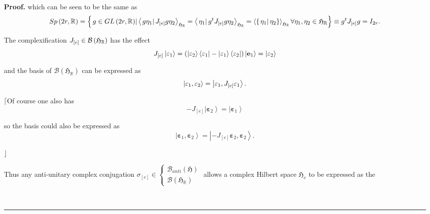 \documentclass[aps,preprint]{revtex4}
\newenvironment{proof}[1][Proof]{\noindent\textbf{#1.} }{\ \rule{0.5em}{0.5em}}
\begin{document}
\begin{proof}
which can be seen to be the same as%
\begin{equation}
Sp\left( 2r,\mathbb{R}\right) =\left\{ \left. g\in GL\left( 2r,\mathbb{R}%
\right) \right\vert \left\langle \left. g\eta_{1}\right\vert J_{\left[ e%
\right] }g\eta_{2}\right\rangle _{\mathfrak{H}_{\mathbb{R}}}=\left\langle
\left. \eta_{1}\right\vert g^{t}J_{\left[ e\right] }g\eta_{2}\right\rangle _{%
\mathfrak{H}_{\mathbb{R}}}=\left\langle \left\{ \left. \eta_{1}\right\vert
\eta_{2}\right\} \right\rangle _{\mathfrak{H}_{\mathbb{R}}}\forall\eta_{1},%
\eta_{2}\in\mathfrak{H}_{\mathbb{R}}\right\} \equiv g^{t}J_{\left[ e\right]
}g=I_{2r}.
\end{equation}

The complexification $J_{\left[ e\right] }\in\mathcal{B}\left( \mathfrak{H}_{%
\mathbb{R}}\right) $ has the effect 
\begin{equation}
J_{\left[ e\right] }\left\vert \mathbf{\varepsilon}_{1}\right\rangle =\left(
\left\vert \mathbf{\varepsilon}_{2}\right\rangle \left\langle \mathbf{%
\varepsilon}_{1}\right\vert -\left\vert \mathbf{\varepsilon}%
_{1}\right\rangle \left\langle \mathbf{\varepsilon}_{2}\right\vert \right)
\left\vert \mathbf{e}_{1}\right\rangle =\left\vert \mathbf{\varepsilon}%
_{2}\right\rangle
\end{equation}

and the basis of $\mathcal{B}\left( \mathfrak{H}_{\mathbb{R}}\right) $ can
be expressed as 
\begin{equation}
\left\vert \mathbf{\varepsilon }_{1},\mathbf{\varepsilon }_{2}\right\rangle
=\left\vert \mathbf{\varepsilon }_{1},J_{\left[ e\right] }\mathbf{%
\varepsilon }_{1}\right\rangle .
\end{equation}

$\lceil$Of course one also has 
\begin{equation}
-J_{\left[ e\right] }\left\vert \mathbf{\varepsilon}_{2}\right\rangle
=\left\vert \mathbf{\varepsilon}_{1}\right\rangle
\end{equation}

so the basis could also be expressed as 
\begin{equation}
\left\vert \mathbf{\varepsilon}_{1},\mathbf{\varepsilon}_{2}\right\rangle
=\left\vert -J_{\left[ e\right] }\mathbf{\varepsilon}_{2},\mathbf{\varepsilon%
}_{2}\right\rangle .
\end{equation}

$\rfloor$

Thus any anti-unitary complex conjugation $\sigma_{\left[ e\right]
}\in\left\{ 
\begin{array}{c}
\mathcal{B}_{anti}\left( \mathfrak{H}\right) \\ 
\mathcal{B}\left( \mathfrak{H}_{\mathbb{R}}\right)%
\end{array}
\right. $ allows a complex Hilbert space $\mathfrak{H}_{e}$ to be expressed
as the


\end{proof}
\end{document}
